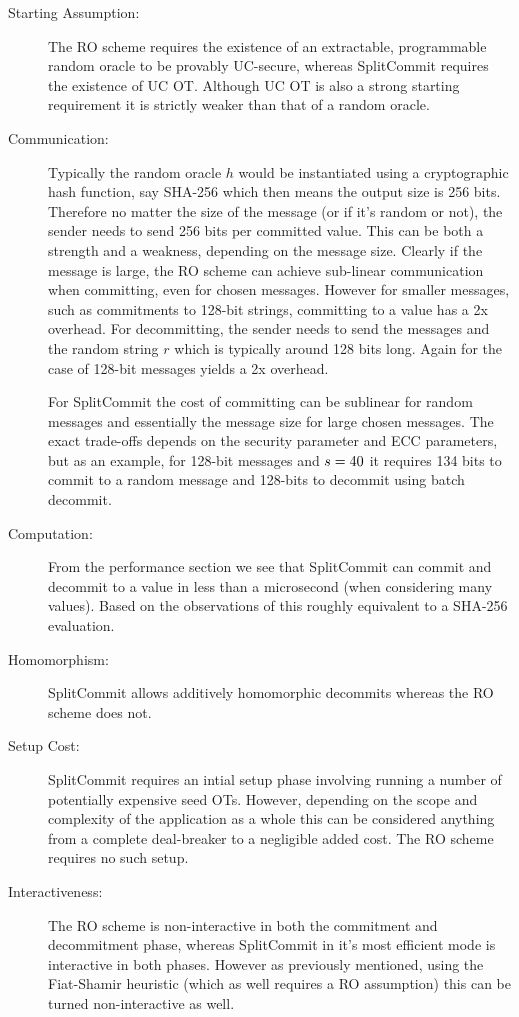 \begin{description}
  \item[Starting Assumption:] The RO scheme requires the existence of an extractable, programmable random oracle to be provably UC-secure, whereas SplitCommit requires the existence of UC OT. Although UC OT is also a strong starting requirement it is strictly weaker than that of a random oracle.
  \item[Communication:] Typically the random oracle $h$ would be instantiated using a cryptographic hash function, say SHA-256 which then means the output size is 256 bits. Therefore no matter the size of the message (or if it's random or not), the sender needs to send 256 bits per committed value. This can be both a strength and a weakness, depending on the message size. Clearly if the message is large, the RO scheme can achieve sub-linear communication when committing, even for chosen messages. However for smaller messages, such as \eg commitments to 128-bit strings, committing to a value has a 2x overhead. For decommitting, the sender needs to send the messages and the random string $r$ which is typically around 128 bits long. Again for the case of 128-bit messages yields a 2x overhead.

  For SplitCommit the cost of committing can be sublinear for random messages and essentially the message size for large chosen messages. The exact trade-offs depends on the security parameter and ECC parameters, but as an example, for 128-bit messages and $s=40$ it requires 134 bits to commit to a random message and 128-bits to decommit using batch decommit.

  \item[Computation:] From the performance section we see that SplitCommit can commit and decommit to a value in less than a microsecond (when considering many values). Based on the observations of \cite{DBLP:conf/pkc/CascudoDDGNT15} this roughly equivalent to a SHA-256 evaluation.
  \item[Homomorphism:] SplitCommit allows additively homomorphic decommits whereas the RO scheme does not.
  \item[Setup Cost:] SplitCommit requires an intial setup phase involving running a number of potentially expensive seed OTs. However, depending on the scope and complexity of the application as a whole this can be considered anything from a complete deal-breaker to a negligible added cost. The RO scheme requires no such setup.
  \item[Interactiveness:] The RO scheme is non-interactive in both the commitment and decommitment phase, whereas SplitCommit in it's most efficient mode is interactive in both phases. However as previously mentioned, using the Fiat-Shamir heuristic (which as well requires a RO assumption) this can be turned non-interactive as well.
\end{description}